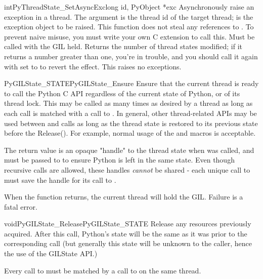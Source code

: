 \begin{cfuncdesc}{int}{PyThreadState_SetAsyncExc}{long id, PyObject *exc}
  Asynchronously raise an exception in a thread. 
  The  argument is the thread id of the target thread;
   is the exception object to be raised.
  This function does not steal any references to .
  To prevent naive misuse, you must write your own C extension 
  to call this.  Must be called with the GIL held. 
  Returns the number of thread states modified; if it returns a number 
  greater than one, you're in trouble, and you should call it again 
  with  set to  to revert the effect.
  This raises no exceptions.
\end{cfuncdesc}

\begin{cfuncdesc}{PyGILState_STATE}{PyGILState_Ensure}{}
Ensure that the current thread is ready to call the Python
C API regardless of the current state of Python, or of its
thread lock.  This may be called as many times as desired
by a thread as long as each call is matched with a call to 
.  
In general, other thread-related APIs may 
be used between  and  calls as long as the 
thread state is restored to its previous state before the Release().
For example, normal usage of the 
and  macros is acceptable.
    
The return value is an opaque "handle" to the thread state when
 was called, and must be passed to
 to ensure Python is left in the same
state. Even though recursive calls are allowed, these handles
\emph{cannot} be shared - each unique call to
 must save the handle for its call to
.
    
When the function returns, the current thread will hold the GIL.
Failure is a fatal error.
\end{cfuncdesc}

\begin{cfuncdesc}{void}{PyGILState_Release}{PyGILState_STATE}
Release any resources previously acquired.  After this call, Python's
state will be the same as it was prior to the corresponding
 call (but generally this state will be
unknown to the caller, hence the use of the GILState API.)
    
Every call to  must be matched by a call to 
 on the same thread.
\end{cfuncdesc}


